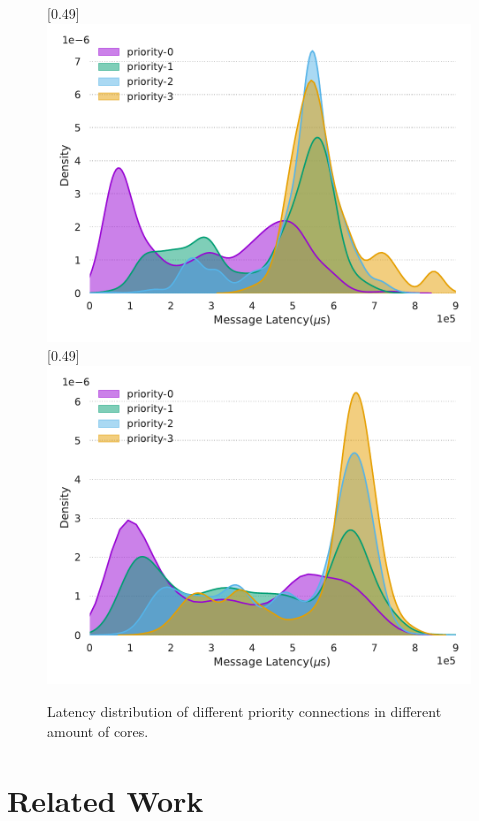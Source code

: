 \documentclass[sigconf,review,anonymous]{acmart}
\begin{document}
\begin{figure}[ht]
    \centering
    [0.49\linewidth]
    {
      \includegraphics[width=\linewidth]{assets/prio-core2.pdf}
    }
    [0.49\linewidth]
    {
      \includegraphics[width=\linewidth]{assets/prio-core4.pdf}
    }
    \caption{Latency distribution of different priority connections in different amount of cores.}
    \label{fig:prio-cores}
\end{figure}

\section{Related Work}
\label{section: Related Work}
\end{document}
